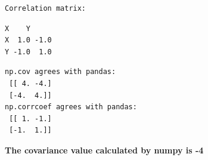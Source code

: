 \documentclass[11pt]{article}
\begin{document}
    
    \begin{Verbatim}[commandchars=\\\{\}]
Correlation matrix:
    \end{Verbatim}

    
    \begin{Verbatim}[commandchars=\\\{\}]
     X    Y
X  1.0 -1.0
Y -1.0  1.0
    \end{Verbatim}

    
    \begin{Verbatim}[commandchars=\\\{\}]
np.cov agrees with pandas:
 [[ 4. -4.]
 [-4.  4.]]
np.corrcoef agrees with pandas:
 [[ 1. -1.]
 [-1.  1.]]
    \end{Verbatim}

    \textbf{The covariance value calculated by numpy is -4}
\end{document}
